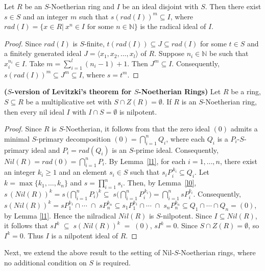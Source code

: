 \documentclass[11pt]{article}
\begin{document}
\begin{lem}\label{l1}
		Let $R$ be an $S$-Noetherian ring and $I$ be an ideal disjoint with $S$. Then there exist $s\in S$ and an integer $m$ such that $s(rad(I))^m\subseteq I$, where $rad(I)=\{x\in R| \ x^n\in I \text{ for some } n\in \mathbb{N}\}$ is the radical ideal of $I$.
	\end{lem}
	\begin{proof}
		Since $rad(I)$ is  $S$-finite, $t(rad(I))\subseteq J\subseteq rad(I)$ for some $t\in S$ and a finitely generated ideal $J=\langle x_1,x_2,\dots,x_l \rangle$ of $R$. Suppose $n_i\in \mathbb{N}$ be such that $x_i^{n_i}\in I$. Take $m=\sum_{i=1}^l (n_i-1)+1$. Then $J^m\subseteq I$. Consequently, $s(rad(I))^m\subseteq J^m\subseteq I$, where $s=t^m$. 
	\end{proof}
    
\begin{theorem} \label{Levitzki-1}\textbf{($S$-version of Levitzki's theorem for $S$-Noetherian Rings)}
Let $R$ be a ring, $S\subseteq R$ be a multiplicative set with $S\cap Z(R) = \emptyset$. If $R$ is an $S$-Noetherian ring, then every nil ideal $I$ with $I\cap S=\emptyset$ is nilpotent.
\end{theorem}

\begin{proof}
Since $R$ is $S$-Noetherian, it follows from \cite[Theorem~2.9]{ts24} that the zero ideal $(0)$ admits a minimal $S$-primary decomposition $(0) = \bigcap_{i=1}^{n} Q_{i}$, where each $Q_i$ is a $P_i$-$S$-primary ideal and $P_{i} = rad(Q_{i})$ is an $S$-prime ideal. Consequently, $Nil(R)= rad(0)=\bigcap\limits_{i=1}^{n} P_{i}$.
By Lemma~\ref{l1}, for each $i=1,\ldots,n$, there exist an integer $k_i \geq 1$ and an element $s_i \in S$ such that $s_{i} P_i^{\,k_i}\subseteq Q_i$. Let $k = \max\{k_1, \dots, k_n\}$ and $s = \prod_{i=1}^{n} s_{i}$. Then, by Lemma~\ref{l0}, $s \,(Nil(R))^{k} 
= s \,\Big(\bigcap\limits_{i=1}^{n} P_{i}\Big)^{k}\subseteq\; s \Big(\bigcap\limits_{i=1}^{n} P_{i}^{\,k_{i}}\Big)
= \bigcap\limits_{i=1}^{n} sP^{k_{i}}_{i}$. Consequently, $s (Nil(R))^{k}= sP^{k_{1}}_{1}\cap \cdots \;\cap\;sP^{k_{n}}_{n}\subseteq s_1P^{k_{1}}_{1}\cap \cdots \;\cap\; s_nP^{k_{n}}_{n}\subseteq Q_{1}\cap\cdots\cap Q_{n}
= (0)$, by Lemma \ref{l1}. Hence the nilradical $Nil(R)$ is $S$-nilpotent. Since $I \subseteq Nil(R)$, it follows that $sI^k \;\subseteq\; s(Nil(R))^k \;=\; (0)$, $sI^{k}=0$. Since $S\cap Z(R)=\emptyset$, so $I^{k}=0$. Thus $I$ is a nilpotent ideal of $R$.
\end{proof}
Next, we extend the above result to the setting of Nil-$S$-Noetherian 
rings, where no additional condition on $S$ is required.
\end{document}
